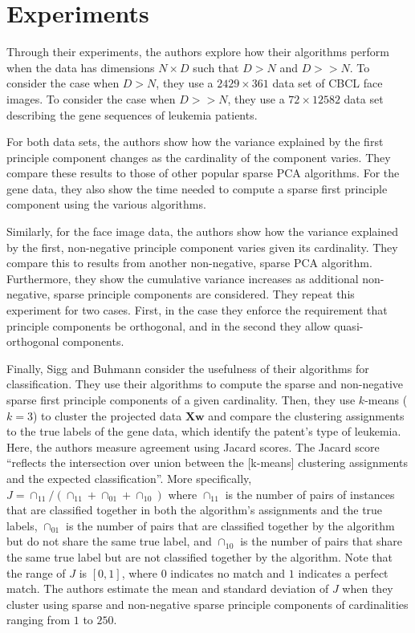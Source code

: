 \documentclass{article}
\begin{document}
\section{Experiments}

Through their experiments, the authors explore how their algorithms perform
when the data has dimensions $N \times D$ such that $D > N$ and $D >> N$.
To consider the case when $D > N$, they use a $2429 \times 361$ data set
of CBCL face images.
To consider the case when $D >> N$, they use a $72 \times 12582$ data set
describing the gene sequences of leukemia patients.

For both data sets, the authors show how the variance explained by the first
principle component changes as the cardinality of the component varies.
They compare these results to those of other popular sparse PCA algorithms.
For the gene data, they also show the time needed to compute a sparse
first principle component using the various algorithms.

Similarly, for the face image data, the authors show how the variance
explained by the first, non-negative principle component varies given
its cardinality.
They compare this to results from another non-negative, sparse PCA algorithm.
Furthermore, they show the cumulative variance increases as additional
non-negative, sparse principle components are considered.
They repeat this experiment for two cases. First, in the case they enforce
the requirement that principle components be orthogonal, and in the second
they allow quasi-orthogonal components.

Finally, Sigg and Buhmann consider the usefulness of their algorithms
for classification. They use their algorithms to compute the sparse
and non-negative sparse first principle components of a given cardinality.
Then, they use $k$-means ($k=3$) to cluster the projected data $\mathbf{Xw}$
and compare the clustering assignments to the true labels of the gene data,
which identify the patent's type of leukemia.
Here, the authors measure agreement using Jacard scores.
The Jacard score ``reflects the intersection over union between the
[k-means] clustering assignments and the expected classification''.
More specifically, $J = \cap_{11} / (\cap_{11} + \cap_{01} + \cap_{10})$
where $\cap_{11}$ is the number of pairs of instances that are
classified together in both the algorithm's assignments and the true labels,
$\cap_{01}$ is the number of pairs that are classified together by the
algorithm but do not share the same true label, and $\cap_{10}$ is the
number of pairs that share the same true label but are not classified
together by the algorithm.
Note that the range of $J$ is $[0, 1]$, where $0$ indicates no match
and $1$ indicates a perfect match.
The authors estimate the mean and standard deviation of $J$ when they
cluster using sparse and non-negative sparse principle components
of cardinalities ranging from $1$ to $250$.
\end{document}
